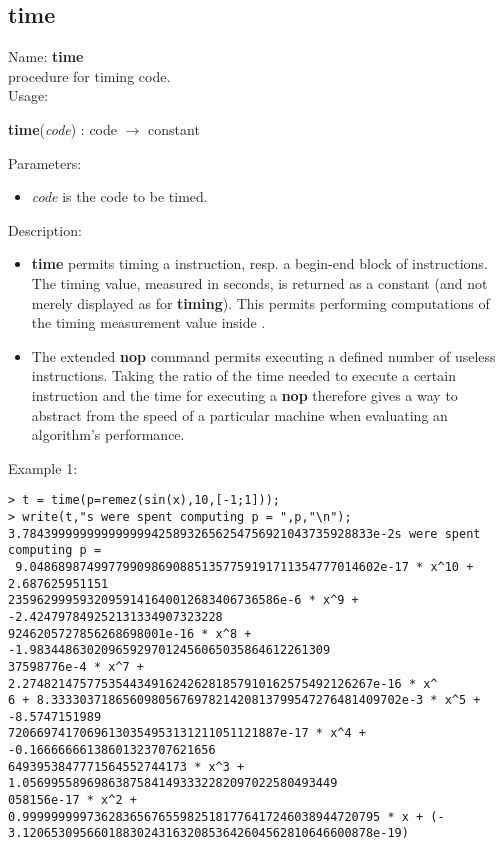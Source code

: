 \subsection{time}
\label{labtime}
\noindent Name: \textbf{time}\\
\phantom{aaa}procedure for timing \sollya code.\\[0.2cm]
\noindent Usage: 
\begin{center}
\textbf{time}(\emph{code}) : \textsf{code} $\rightarrow$ \textsf{constant}\\
\end{center}
Parameters: 
\begin{itemize}
\item \emph{code} is the code to be timed.
\end{itemize}
\noindent Description: \begin{itemize}

\item \textbf{time} permits timing a \sollya instruction, resp. a begin-end block
   of \sollya instructions. The timing value, measured in seconds, is returned
   as a \sollya constant (and not merely displayed as for \textbf{timing}). This 
   permits performing computations of the timing measurement value inside \sollya.

\item The extended \textbf{nop} command permits executing a defined number of
   useless instructions. Taking the ratio of the time needed to execute a
   certain \sollya instruction and the time for executing a \textbf{nop}
   therefore gives a way to abstract from the speed of a particular 
   machine when evaluating an algorithm's performance.
\end{itemize}
\noindent Example 1: 
\begin{center}\begin{minipage}{15cm}\begin{Verbatim}[frame=single]
> t = time(p=remez(sin(x),10,[-1;1]));
> write(t,"s were spent computing p = ",p,"\n");
3.7843999999999999994258932656254756921043735928833e-2s were spent computing p =
 9.0486898749977990986908851357759191711354777014602e-17 * x^10 + 2.687625951151
23596299959320959141640012683406736586e-6 * x^9 + -2.424797849252131334907323228
9246205727856268698001e-16 * x^8 + -1.983448630209659297012456065035864612261309
37598776e-4 * x^7 + 2.2748214757753544349162426281857910162575492126267e-16 * x^
6 + 8.3333037186560980567697821420813799547276481409702e-3 * x^5 + -8.5747151989
72066974170696130354953131211051121887e-17 * x^4 + -0.16666666138601323707621656
6493953847771564552744173 * x^3 + 1.05699558969863875841493332282097022580493449
058156e-17 * x^2 + 0.99999999973628365676559825181776417246038944720795 * x + (-
3.1206530956601883024316320853642604562810646600878e-19)
\end{Verbatim}
\end{minipage}\end{center}
